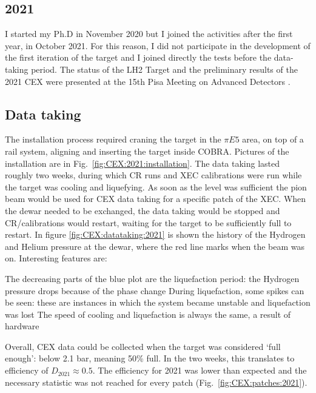 \begin{refsection}
\section{2021}
    I started my Ph.D in November 2020 but I joined the activities after the first year, in October 2021. 
    For this reason, I did not participate in the development of the first iteration of the target and I joined directly the tests before the data-taking period.
    The status of the LH2 Target and the preliminary results of the 2021 CEX were presented at the 15th Pisa Meeting on Advanced Detectors \cite{Elba:mio}.

    \subsection{Data taking}
        The installation process required craning the target in the $\pi E5$ area, on top of a rail system, aligning and inserting the target inside COBRA.
        Pictures of the installation are in Fig.~\ref{fig:CEX:2021:installation}.
        The data taking lasted roughly two weeks, during which CR runs and XEC calibrations were run while the target was cooling and liquefying. 
        As soon as the level was sufficient the pion beam would be used for CEX data taking for a specific patch of the XEC.  
        When the dewar needed to be exchanged, the data taking would be stopped and CR/calibrations would restart, waiting for the target to be sufficiently full to restart.
        \noindent
        In figure \ref{fig:CEX:datataking:2021} is shown the history of the Hydrogen and Helium pressure at the dewar, where the red line marks when the beam was on. 
        Interesting features are:
        \begin{outline}
            \1 The decreasing parts of the blue plot are the liquefaction period: the Hydrogen pressure drops because of the phase change
            \1 During liquefaction, some spikes can be seen: these are instances in which the system became unstable and liquefaction was lost
            \1 The speed of cooling and liquefaction is always the same, a result of hardware 
        \end{outline}
        Overall, CEX data could be collected when the target was considered `full enough': below 2.1 bar, meaning 50\% full. 
        In the two weeks, this translates to efficiency of $D_{2021}\approx0.5$.
        The efficiency for 2021 was lower than expected and the necessary statistic was not reached for every patch (Fig.~\ref{fig:CEX:patches:2021}).


\end{refsection}
